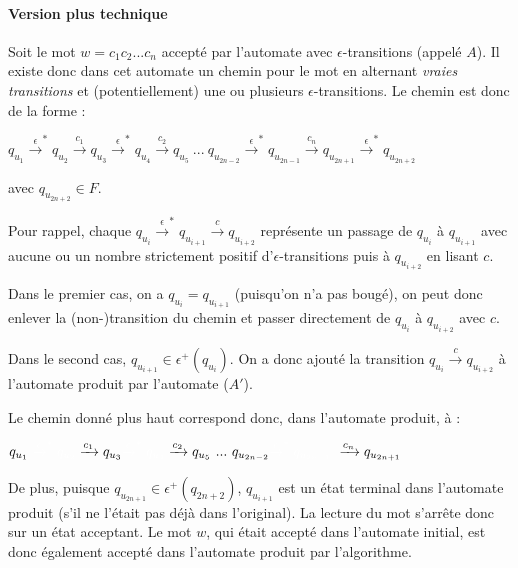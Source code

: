\documentclass{article}[11pt]
\theoremstyle{definition}
\begin{document}
\paragraph*{Version plus technique} Soit le mot $w = c_1c_2...c_n$ accepté par l'automate avec $\epsilon$-transitions (appelé $A$). Il existe donc dans cet automate un chemin pour le mot en alternant \textit{vraies transitions} et (potentiellement) une ou plusieurs $\epsilon$-transitions. Le chemin est donc de la forme :\newline

$q_{u_1} \xrightarrow{\epsilon}^* q_{u_2} \xrightarrow{c_1} q_{u_3} \xrightarrow{\epsilon}^* q_{u_4} \xrightarrow{c_2} q_{u_5}~...~q_{u_{2n-2}} \xrightarrow{\epsilon}^* q_{u_{2n-1}} \xrightarrow{c_{n}} q_{u_{2n+1}} \xrightarrow{\epsilon}^* q_{u_{2n+2}} $ \newline

avec $q_{u_{2n+2}} \in F$.\newline

Pour rappel, chaque $q_{u_i} \xrightarrow{\epsilon}^* q_{u_{i+1}} \xrightarrow{c} q_{u_{i+2}}$ représente un passage de $q_{u_i}$ à $q_{u_{i+1}}$ avec aucune ou un nombre strictement positif d'$\epsilon$-transitions puis à $q_{u_{i+2}}$ en lisant $c$. \newline

Dans le premier cas, on a $q_{u_i} = q_{u_{i+1}}$ (puisqu'on n'a pas bougé), on peut donc enlever la (non-)transition du chemin et passer directement de $q_{u_i}$ à $q_{u_{i+2}}$ avec $c$. \newline

Dans le second cas, $q_{u_{i+1}} \in \epsilon^+(q_{u_i})$. On a donc ajouté la transition $q_{u_i} \xrightarrow{c} q_{u_{i+2}}$ à l'automate produit par l'automate ($A'$). \newline

Le chemin donné plus haut correspond donc, dans l'automate produit, à :\newline

$q_{u_1}~\textcolor{white}{\xrightarrow{\epsilon}^* q_{u_2}} \xrightarrow{c_1} q_{u_3} \textcolor{white}{\xrightarrow{\epsilon}^* q_{u_4}} \xrightarrow{c_2} q_{u_5}~...~q_{u_{2n-2}} \textcolor{white}{\xrightarrow{\epsilon}^* q_{u_{2n-1}}} ~\xrightarrow{c_{n}} q_{u_{2n+1}}$\newline

De plus, puisque $q_{u_{2n+1}} \in \epsilon^+(q_{2n+2})$, $q_{u_{i+1}}$ est un état terminal dans l'automate produit (s'il ne l'était pas déjà dans l'original). La lecture du mot s'arrête donc sur un état acceptant. Le mot $w$, qui était accepté dans l'automate initial, est donc également accepté dans l'automate produit par l'algorithme.
\end{document}
